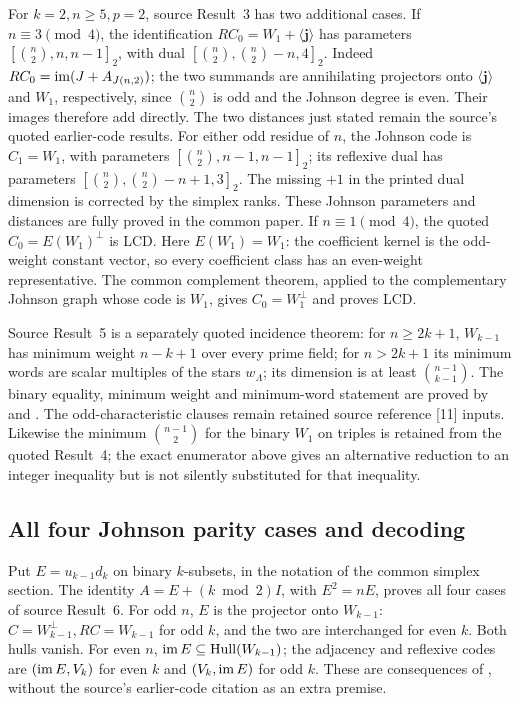 For $k=2,n\geq5,p=2$, source Result~3 has two additional cases.
If $n\equiv3\pmod4$, the identification
$RC_0=W_1+\langle\mathbf j\rangle$ has parameters
$[\binom n2,n,n-1]_2$, with dual
$[\binom n2,\binom n2-n,4]_2$.
Indeed $RC_0=\operatorname{im}(J+A_{J(n,2)})$; the two summands are annihilating
projectors onto $\langle\mathbf j\rangle$ and $W_1$, respectively,
since $\binom n2$ is odd and the Johnson degree is even.
Their images therefore add directly. The two distances just stated
remain the source's quoted earlier-code results.
For either odd residue of $n$, the Johnson code is
$C_1=W_1$, with parameters $[\binom n2,n-1,n-1]_2$;
its reflexive dual has parameters
$[\binom n2,\binom n2-n+1,3]_2$.
The missing $+1$ in the printed dual dimension is corrected by the
simplex ranks. These Johnson parameters and distances are fully proved
in the common paper.
If $n\equiv1\pmod4$, the quoted $C_0=E(W_1)^\perp$ is LCD.
Here $E(W_1)=W_1$: the coefficient kernel is the odd-weight constant
vector, so every coefficient class has an even-weight representative.
The common complement theorem, applied to the complementary Johnson
graph whose code is $W_1$, gives $C_0=W_1^\perp$ and proves LCD.

Source Result~5 is a separately quoted incidence theorem: for
$n\geq2k+1$, $W_{k-1}$ has minimum weight $n-k+1$ over every prime
field; for $n>2k+1$ its minimum words are scalar multiples of the stars
$w_\Lambda$; its dimension is at least $\binom{n-1}{k-1}$.
The binary equality, minimum weight and minimum-word statement are
proved by  and .
The odd-characteristic clauses remain retained source reference [11]
inputs. Likewise the minimum $\binom{n-1}2$ for the binary $W_1$ on
triples is retained from the quoted Result~4; the exact enumerator above
gives an alternative reduction to an integer inequality but is not
silently substituted for that inequality.

\subsection{All four Johnson parity cases and decoding}
Put $E=u_{k-1}d_k$ on binary $k$-subsets, in the notation of the common
simplex section. The identity $A=E+(k\bmod2)I$, with $E^2=nE$, proves
all four cases of source Result~6. For odd $n$, $E$ is the projector
onto $W_{k-1}$: $C=W_{k-1}^\perp,RC=W_{k-1}$ for odd $k$, and the
two are interchanged for even $k$. Both hulls vanish.
For even $n$, $\operatorname{im} E\subseteq\operatorname{Hull}(W_{k-1})$;
the adjacency and reflexive codes are $(\operatorname{im} E,V_k)$ for even $k$ and
$(V_k,\operatorname{im} E)$ for odd $k$. These are consequences of
, without the source's earlier-code citation as an
extra premise.

